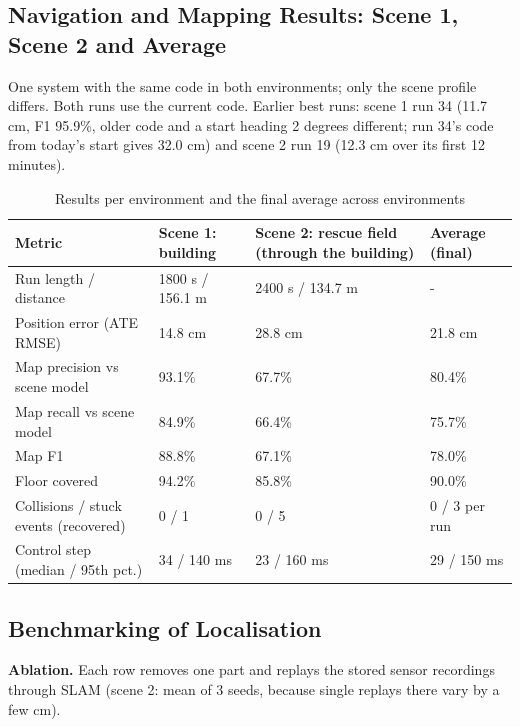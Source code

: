 \documentclass[11pt, a4paper]{article}
\begin{document}
\subsection{Navigation and Mapping Results: Scene 1, Scene 2 and Average}
\noindent
One system with the same code in both environments; only the scene profile differs. Both runs use the current code. Earlier best runs: scene 1 run 34 (11.7 cm, F1 95.9\%, older code and a start heading 2 degrees different; run 34's code from today's start gives 32.0 cm) and scene 2 run 19 (12.3 cm over its first 12 minutes).

\begin{table}[H]
    \centering
    \footnotesize
    \renewcommand{\arraystretch}{1.2}
    \begin{tabular}{|p{4.8cm}|p{2.8cm}|p{4.6cm}|p{2.2cm}|}
        \hline
        \textbf{Metric} & \textbf{Scene 1: building} & \textbf{Scene 2: rescue field (through the building)} & \textbf{Average (final)} \\
        \hline
        Run length / distance & 1800 s / 156.1 m & 2400 s / 134.7 m & - \\
        \hline
        Position error (ATE RMSE) & 14.8 cm & 28.8 cm & 21.8 cm \\
        \hline
        Map precision vs scene model & 93.1\% & 67.7\% & 80.4\% \\
        \hline
        Map recall vs scene model & 84.9\% & 66.4\% & 75.7\% \\
        \hline
        Map F1 & 88.8\% & 67.1\% & 78.0\% \\
        \hline
        Floor covered & 94.2\% & 85.8\% & 90.0\% \\
        \hline
        Collisions / stuck events (recovered) & 0 / 1 & 0 / 5 & 0 / 3 per run \\
        \hline
        Control step (median / 95th pct.) & 34 / 140 ms & 23 / 160 ms & 29 / 150 ms \\
        \hline
    \end{tabular}
    \caption{Results per environment and the final average across environments}
\end{table}

\subsection{Benchmarking of Localisation}
\noindent
\textbf{Ablation.} Each row removes one part and replays the stored sensor recordings through SLAM (scene 2: mean of 3 seeds, because single replays there vary by a few cm).
\end{document}
